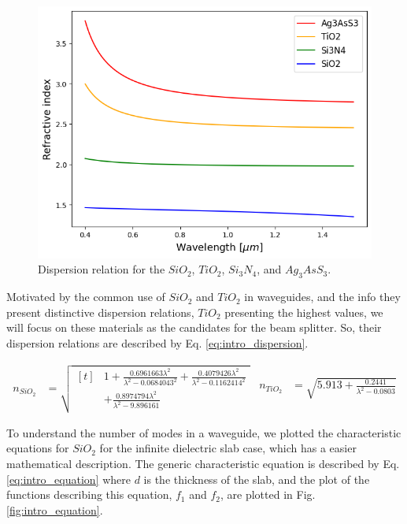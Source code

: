 \documentclass[conference, a4paper]{IEEEtran}
\begin{document}
\begin{figure}[H]
    \centering
    \includegraphics[scale=0.4]{dispersion_relation.png}
    \caption{Dispersion relation for the $SiO_2$, $TiO_2$, $Si_3N_4$, and $Ag_3AsS_3$.}
    \label{fig:intro_dispersion}
\end{figure}

Motivated by the common use of $SiO_2$ and $TiO_2$ in waveguides, and the info they present distinctive dispersion relations, $TiO_2$ presenting the highest values, we will focus on these materials as the candidates for the beam splitter. So, their dispersion relations are described by Eq. \eqref{eq:intro_dispersion}.

\begin{subequations}
    \begin{align}
        n_{SiO_2} &= 
        \sqrt{\begin{aligned}[t]
            &1 + \frac{0.6961663 \lambda^2}{\lambda^2 - 0.0684043^2} 
            + \frac{0.4079426 \lambda^2}{\lambda^2 - 0.1162414^2} \\
            &+ \frac{0.8974794 \lambda^2}{\lambda^2 - 9.896161}
        \end{aligned}}
    \end{align}
    \begin{align}
        n_{TiO_2} &= \sqrt{5.913 + \frac{0.2441}{\lambda^2 - 0.0803}}
    \end{align}
    \label{eq:intro_dispersion}
\end{subequations}

To understand the number of modes in a waveguide, we plotted the characteristic equations for $SiO_2$ for the infinite dielectric slab case, which has a easier mathematical description. The generic characteristic equation is described by Eq. \eqref{eq:intro_equation} where $d$ is the thickness of the slab, and the plot of the functions describing this equation, $f_1$ and $f_2$, are plotted in Fig. \ref{fig:intro_equation}.
\end{document}
